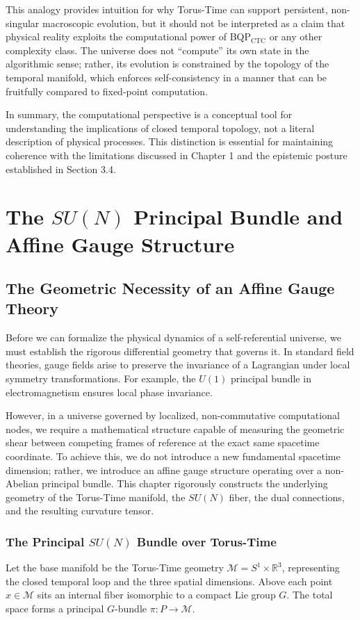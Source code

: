 \documentclass[12pt,openany]{book}
\theoremstyle{plain}
\theoremstyle{definition}
\theoremstyle{remark}
\begin{document}
This analogy provides intuition for why Torus-Time can support persistent,
non-singular macroscopic evolution, but it should not be interpreted as a
claim that physical reality exploits the computational power of
BQP$_{\text{CTC}}$ or any other complexity class. The universe does not
``compute'' its own state in the algorithmic sense; rather, its evolution is
constrained by the topology of the temporal manifold, which enforces
self-consistency in a manner that can be fruitfully compared to fixed-point
computation.

In summary, the computational perspective is a conceptual tool for
understanding the implications of closed temporal topology, not a literal
description of physical processes. This distinction is essential for
maintaining coherence with the limitations discussed in Chapter 1 and the
epistemic posture established in Section 3.4.

\chapter{The $SU(N)$ Principal Bundle and Affine Gauge Structure}

\section {The Geometric Necessity of an Affine Gauge Theory}

Before we can formalize the physical dynamics of a self-referential universe, we must establish the rigorous differential geometry that governs it. In standard field theories, gauge fields arise to preserve the invariance of a Lagrangian under local symmetry transformations. For example, the $U(1)$ principal bundle in electromagnetism ensures local phase invariance.

However, in a universe governed by localized, non-commutative computational nodes, we require a mathematical structure capable of measuring the geometric shear between competing frames of reference at the exact same spacetime coordinate. To achieve this, we do not introduce a new fundamental spacetime dimension; rather, we introduce an affine gauge structure operating over a non-Abelian principal bundle. This chapter rigorously constructs the underlying geometry of the Torus-Time manifold, the $SU(N)$ fiber, the dual connections, and the resulting curvature tensor.

\subsection{The Principal $SU(N)$ Bundle over Torus-Time} 
Let the base manifold be the Torus-Time geometry $\mathcal{M} = S^1 \times \mathbb{R}^3$, representing the closed temporal loop and the three spatial dimensions. Above each point $x \in \mathcal{M}$ sits an internal fiber isomorphic to a compact Lie group $G$. The total space forms a principal $G$-bundle $\pi: P \to \mathcal{M}$.
\end{document}
